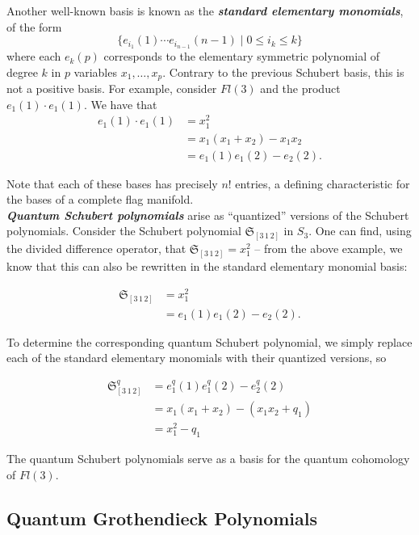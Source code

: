 Another well-known basis is known as the \textbf{\textit{standard elementary monomials}}, of the form
\[
    \{e_{i_1}(1) \cdots e_{i_{n-1}}(n-1) \mid 0 \leq i_k \leq k \}
\]
where each $e_k(p)$ corresponds to the elementary symmetric polynomial of degree $k$ in $p$ variables $x_1, \dots, x_p$. Contrary to the previous Schubert basis, this is not a positive basis. For example, consider $Fl(3)$ and the product $e_1(1) \cdot e_1(1).$ We have that
\begin{align*}
    e_1(1) \cdot e_1(1) &= x_1^2 \\
    &= x_1(x_1 + x_2) - x_1x_2 \\
    &= e_1(1)e_1(2) - e_2(2).
\end{align*}

Note that each of these bases has precisely $n!$ entries, a defining characteristic for the bases of a complete flag manifold. \\

\textbf{\textit{Quantum Schubert polynomials}} arise as ``quantized'' versions of the Schubert polynomials. Consider the Schubert polynomial $\mathfrak{S}_{[3 \, 1 \, 2]}$ in $S_3$. One can find, using the divided difference operator, that $\mathfrak{S}_{[3 \, 1 \, 2]} = x_1^2$ -- from the above example, we know that this can also be rewritten in the standard elementary monomial basis:

\begin{align*}
    \mathfrak{S}_{[3 \, 1 \, 2]} &= x_1^2 \\
    &= e_1(1) e_1(2) - e_2(2).
\end{align*}

To determine the corresponding quantum Schubert polynomial, we simply replace each of the standard elementary monomials with their quantized versions, so

\begin{align*}
    \mathfrak{S}_{[3 \, 1 \, 2]}^q &= e_1^q(1) e_1^q(2) - e_2^q(2) \\
    &= x_1(x_1 + x_2) - (x_1x_2 + q_1) \\
    &= x_1^2 - q_1
\end{align*}

The quantum Schubert polynomials serve as a basis for the quantum cohomology of $Fl(3)$.

\subsection{Quantum Grothendieck Polynomials}


